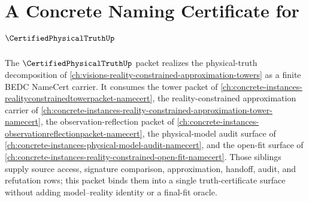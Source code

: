 \chapter{A Concrete Naming Certificate for $\CertifiedPhysicalTruthUp$}
\label{ch:concrete-instances-certified-physical-truth-namecert}

The $\CertifiedPhysicalTruthUp$ packet realizes the physical-truth decomposition of \autoref{ch:visions-reality-constrained-approximation-towers} as a finite BEDC NameCert carrier. It consumes the tower packet of \autoref{ch:concrete-instances-realityconstrainedtowerpacket-namecert}, the reality-constrained approximation carrier of \autoref{ch:concrete-instances-reality-constrained-approximation-tower-namecert}, the observation-reflection packet of \autoref{ch:concrete-instances-observationreflectionpacket-namecert}, the physical-model audit surface of \autoref{ch:concrete-instances-physical-model-audit-namecert}, and the open-fit surface of \autoref{ch:concrete-instances-reality-constrained-open-fit-namecert}. Those siblings supply source access, signature comparison, approximation, handoff, audit, and refutation rows; this packet binds them into a single truth-certificate surface without adding model--reality identity or a final-fit oracle.

